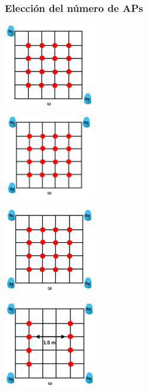 \documentclass{beamer}
\begin{document}
\begin{frame}
\frametitle{Elección del número de APs}
\centering

\begin{minipage}{0.45\textwidth}
    \centering
    \includegraphics[width=4.0cm]{figs/dos_apes.png}
\end{minipage}
\hfill
\begin{minipage}{0.45\textwidth}
    \centering
    \includegraphics[width=4.0cm]{figs/tres_apes.png}
\end{minipage}

\vspace{0.3cm} %

\begin{minipage}{0.45\textwidth}
    \centering
    \includegraphics[width=4.0cm]{figs/cuatro_apes.png} %
\end{minipage}
\hfill
\begin{minipage}{0.45\textwidth}
    \centering
    \includegraphics[width=4.0cm]{figs/cuatro_apes_espaciados.png} %
\end{minipage}

\end{frame}
\end{document}
